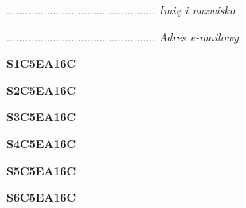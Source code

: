 \begin{turn}{90}\begin{minipage}{\linewidth} \vspace{20mm} ................................................  \textit{Imię i nazwisko}\end{minipage}\end{turn}

\begin{turn}{90}\begin{minipage}{\linewidth} \vspace{20mm} ................................................  \textit{Adres e-mailowy}\end{minipage}\end{turn}

\begin{turn}{90}\huge \begin{minipage}{\linewidth} \vspace{10mm}\textbf{S1C5EA16C}\end{minipage}\end{turn}

\begin{turn}{90}\huge \begin{minipage}{\linewidth} \vspace{10mm}\textbf{S2C5EA16C}\end{minipage}\end{turn}

\begin{turn}{90}\huge \begin{minipage}{\linewidth} \vspace{10mm}\textbf{S3C5EA16C}\end{minipage}\end{turn}

\begin{turn}{90}\huge \begin{minipage}{\linewidth} \vspace{10mm}\textbf{S4C5EA16C}\end{minipage}\end{turn}

\begin{turn}{90}\huge \begin{minipage}{\linewidth} \vspace{10mm}\textbf{S5C5EA16C}\end{minipage}\end{turn}

\begin{turn}{90}\huge \begin{minipage}{\linewidth} \vspace{10mm}\textbf{S6C5EA16C}\end{minipage}\end{turn}

